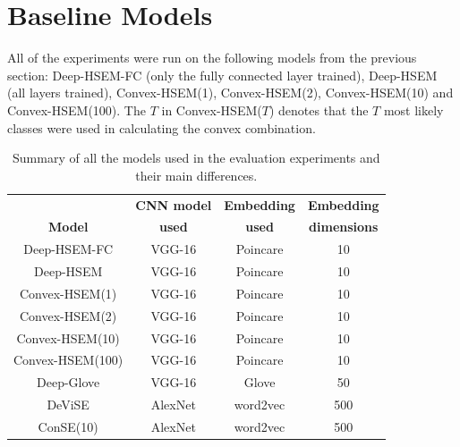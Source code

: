 \documentclass[12pt]{report}
\begin{document}
\section{Baseline Models}
All of the experiments were run on the following models from the previous section: Deep-HSEM-FC (only the fully connected layer trained), Deep-HSEM (all layers trained), Convex-HSEM(1), Convex-HSEM(2), Convex-HSEM(10) and Convex-HSEM(100). The $T$ in Convex-HSEM($T$) denotes that the $T$ most likely classes were used in calculating the convex combination.
\begin{table}
\centering
\begin{tabular}{@{}cccc@{}}
\toprule
\multicolumn{1}{c}{ }& \multicolumn{1}{c}{\textbf{CNN model}} & \multicolumn{1}{c}{\textbf{Embedding}}& \multicolumn{1}{c}{\textbf{Embedding}} \\ 
\multicolumn{1}{c}{\textbf{Model}}& \multicolumn{1}{c}{\textbf{used}} & \multicolumn{1}{c}{\textbf{used}}& \multicolumn{1}{c}{\textbf{dimensions}} \\
\midrule
\multicolumn{1}{c}{Deep-HSEM-FC}& \multicolumn{1}{c}{VGG-16}& \multicolumn{1}{c}{Poincare} &  \multicolumn{1}{c}{10}                \\
\multicolumn{1}{c}{Deep-HSEM}& \multicolumn{1}{c}{VGG-16}& \multicolumn{1}{c}{Poincare}    & \multicolumn{1}{c}{10}                 \\
\multicolumn{1}{c}{Convex-HSEM(1)}& \multicolumn{1}{c}{VGG-16}& \multicolumn{1}{c}{Poincare} & \multicolumn{1}{c}{10}               \\
\multicolumn{1}{c}{Convex-HSEM(2)}& \multicolumn{1}{c}{VGG-16}& \multicolumn{1}{c}{Poincare} & \multicolumn{1}{c}{10}               \\
\multicolumn{1}{c}{Convex-HSEM(10)}& \multicolumn{1}{c}{VGG-16}& \multicolumn{1}{c}{Poincare}&  \multicolumn{1}{c}{10}              \\
\multicolumn{1}{c}{Convex-HSEM(100)}& \multicolumn{1}{c}{VGG-16}& \multicolumn{1}{c}{Poincare} & \multicolumn{1}{c}{10}             \\
\multicolumn{1}{c}{Deep-Glove}& \multicolumn{1}{c}{VGG-16}& \multicolumn{1}{c}{Glove \cite{Pennington2014}} & \multicolumn{1}{c}{50}\\  
\multicolumn{1}{c}{DeViSE \cite{Frome2013}} & \multicolumn{1}{c}{AlexNet\cite{Krizhevsky2012}}& \multicolumn{1}{c}{word2vec \cite{Mikolov}} & \multicolumn{1}{c}{500}                        \\
\multicolumn{1}{c}{ConSE(10) \cite{Norouzi2013}}& \multicolumn{1}{c}{AlexNet}& \multicolumn{1}{c}{word2vec} &  \multicolumn{1}{c}{500}  \\  
\bottomrule
\end{tabular}
\caption{Summary of all the models used in the evaluation experiments and their main differences.}
\label{tbl:blinemodels}
\end{table}
\end{document}

